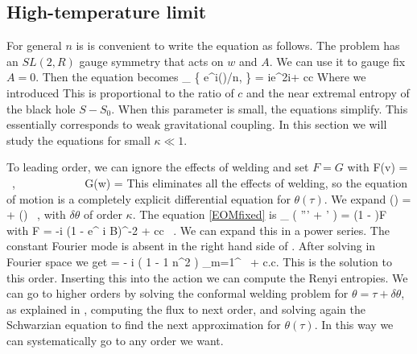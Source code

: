 \subsection{High-temperature limit}

For general $n$ is is convenient to write the equation as follows. 
The problem has an $SL(2,R)$ gauge symmetry that acts on $w$ and $A$. We can use it to gauge fix $A=0$. Then the equation  becomes
\be \label{EOMfixed}
\p_\tau
\{ e^{i\theta(\tau)/n}, \tau \}  = \kappa 
ie^{2i\tau}  + cc
\ee
Where we introduced
\be
\kappa \equiv  {} 
\ee
This is proportional to the ratio of $c$ and the near extremal entropy of the black hole $S-S_0$. 
When this parameter is small, the equations simplify. This essentially corresponds to weak gravitational coupling. In this section we will study the equations for small $\kappa \ll 1$. 


To leading order, we can ignore the effects of welding and set $F=G$ with
\be\label{Fleading}
F(v) =    \ , ~~~~~~~~~~~ G(w) =  
\ee
This eliminates all the effects of welding, so the equation of motion is a completely explicit differential equation for $\theta(\tau)$.
We expand
\be
\theta(\tau) = \tau +  \delta \theta(\tau) \ ,
\ee
with $\delta \theta$ of order $\kappa$. 
The equation \eqref{EOMfixed} is
\be\label{weakeom}
\p_{\tau} \left( \delta \theta''' +  \delta\theta' \right)   = (1 - ){\cal F} 
\ee
with
\be\label{fluxdef}
{\cal F} = -i    \left(1 - { e^{ i \tau} \over  B}\right)^{-2} + cc \ .
\ee
We can expand this in a power series. The constant Fourier mode is absent in the right hand side of . After solving  in Fourier space we get 
\be {}
\delta \theta = - i { \kappa {} } ( 1 - { 1 \over n^2 } ) \sum_{m=1}^  \, + c.c. 
\ee
This is the solution to this order. Inserting this into the action we 
can compute the Renyi entropies. We can go to higher orders by solving the conformal welding problem for 
$\theta = \tau + \delta \theta$, as explained in \cite{Mumford}, computing the flux to next order, and solving again
the Schwarzian equation to find the next approximation for $\theta(\tau)$. In this way we can systematically go to any order we want. 

